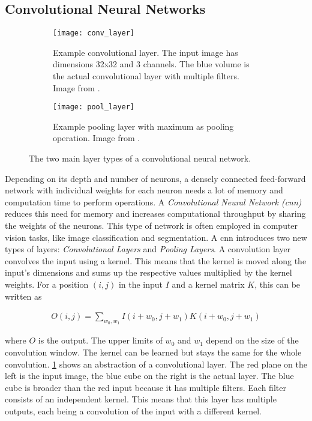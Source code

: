 \subsection{Convolutional Neural Networks}

\begin{figure}[!tbp]
	\centering
	\begin{subfigure}[t]{0.45\textwidth}
		\centering
    	\texttt{[image: conv\_layer]}
    	\caption{Example convolutional layer. The input image has dimensions 32x32 and 3 channels. The blue volume is the actual convolutional layer with multiple filters. Image from \cite{convolutional_layer_image}.}
    	\label{fig:conv_layer}
	\end{subfigure}
	\hfill
	\begin{subfigure}[t]{0.5\textwidth}
		\centering
    	\texttt{[image: pool\_layer]}
    	\caption{Example pooling layer with maximum as pooling operation. Image from \cite{pooling_layer_image}.}
    	\label{fig:pool_layer}
	\end{subfigure}
	\caption{The two main layer types of a convolutional neural network.}
\end{figure} 

Depending on its depth and number of neurons, a densely connected feed-forward network with individual weights for each neuron needs a lot of memory and computation time to perform operations. A \textit{Convolutional Neural Network (\gls{cnn})} reduces this need for memory and increases computational throughput by sharing the weights of the neurons. This type of network is often employed in computer vision tasks, like image classification and segmentation. A \gls{cnn} introduces two new types of layers: \textit{Convolutional Layers} and \textit{Pooling Layers}. A convolution layer convolves the input using a kernel. This means that the kernel is moved along the input's dimensions and sums up the respective values multiplied by the kernel weights. For a position $(i, j)$ in the input $I$ and a kernel matrix $K$, this can be written as

\begin{align}
O(i, j) = \sum\limits_{w_0, w_1} I(i + w_0, j + w_1)K(i + w_0, j + w_1) \label{eqn:convolutional_layer}
\end{align} 

where $O$ is the output. The upper limits of $w_0$ and $w_1$ depend on the size of the convolution window.
The kernel can be learned but stays the same for the whole convolution. \fig \ref{fig:conv_layer} shows an abstraction of a convolutional layer. The red plane on the left is the input image, the blue cube on the right is the actual layer. The blue cube is broader than the red input because it has multiple filters. Each filter consists of an independent kernel. This means that this layer has multiple outputs, each being a convolution of the input with a different kernel.

